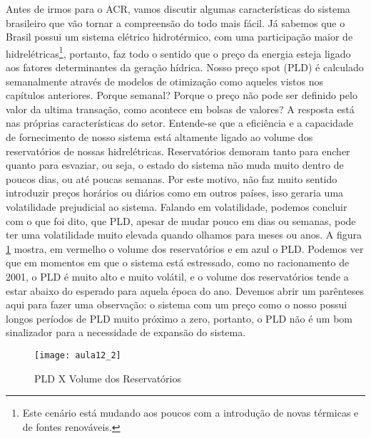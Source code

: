 Antes de irmos para o ACR, vamos discutir algumas características do sistema brasileiro que vão tornar a compreensão do todo mais fácil. Já sabemos que o Brasil possui um sistema elétrico hidrotérmico, com uma participação maior de hidrelétricas\footnote{Este cenário está mudando aos poucos com a introdução de novas térmicas e de fontes renováveis.}, portanto, faz todo o sentido que o preço da energia esteja ligado aos fatores determinantes da geração hídrica. Nosso preço spot (PLD) é calculado semanalmente através de modelos de otimização como aqueles vistos nos capítulos anteriores. Porque semanal? Porque o preço não pode ser definido pelo valor da ultima transação, como acontece em bolsas  de valores? A resposta está nas próprias características do setor. Entende-se que a eficiência e a capacidade de fornecimento de nosso sistema está altamente ligado ao volume dos reservatórios de nossas hidrelétricas. Reservatórios demoram tanto para encher quanto para esvaziar, ou seja, o estado do sistema não muda muito dentro de poucos dias, ou até poucas semanas. Por este motivo, não faz muito sentido introduzir preços horários ou diários como em outros países, isso geraria uma volatilidade prejudicial ao sistema. Falando em volatilidade, podemos concluir com o que foi dito, que PLD, apesar de mudar pouco em dias ou semanas, pode ter uma volatilidade muito elevada quando olhamos para meses ou anos. A figura \ref{fig:aula12_2} mostra, em vermelho o volume dos reservatórios e em azul o PLD. Podemos ver que em momentos em que o sistema está estressado, como no racionamento de 2001, o PLD é muito alto e muito volátil, e o volume dos reservatórios tende a estar abaixo do esperado para aquela época do ano. Devemos abrir um parênteses aqui para fazer uma observação: o sistema com um preço como o nosso possui longos períodos de PLD muito próximo a zero, portanto, o PLD não é um bom sinalizador para a necessidade de expansão do sistema.   


\begin{figure}[H]
\begin{centering}
\texttt{[image: aula12\_2]}\protect\caption{\label{fig:aula12_2} PLD X Volume dos Reservatórios}
\end{centering}
\end{figure}

